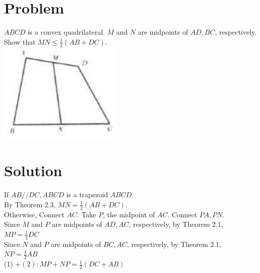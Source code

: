 \documentclass{article}
\begin{document}
\section*{Problem}
\(A B C D\) is a convex quadrilateral. \(M\) and \(N\) are midpoints of \(A D, B C\), respectively. Show that \(M N \leq \frac{1}{2}(A B+D C)\).\\
\centering
\includegraphics[width=\textwidth]{images/044(4).jpg}

\section*{Solution}
If \(A B / / D C, A B C D\) is a trapezoid \(A B C D\).\\
By Theorem 2.3, \(M N=\frac{1}{2}(A B+D C)\).\\
Otherwise, Connect \(A C\). Take \(P\), the midpoint of \(A C\). Connect \(P A, P N\).\\
Since \(M\) and \(P\) are midpoints of \(A D, A C\), respectively, by Theorem 2.1,\\
\(M P=\frac{1}{2} D C\)\\
Since \(N\) and \(P\) are midpoints of \(B C, A C\), respectively, by Theorem 2.1,\\
\(N P=\frac{1}{2} A B\)\\
(1) \(+(2): M P+N P=\frac{1}{2}(D C+A B)\)
\end{document}
